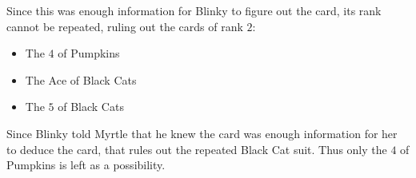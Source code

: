 Since this was enough information for Blinky to figure out the card, its
rank cannot be repeated, ruling out the cards of rank \(2\):

\begin{itemize}
  \item The \(4\) of Pumpkins
  \item The Ace of Black Cats
  \item The \(5\) of Black Cats
\end{itemize}

Since Blinky told Myrtle that he knew the card was enough information
for her to deduce the card, that rules out the repeated Black Cat suit.
Thus only the \(4\) of Pumpkins is left as a possibility.
